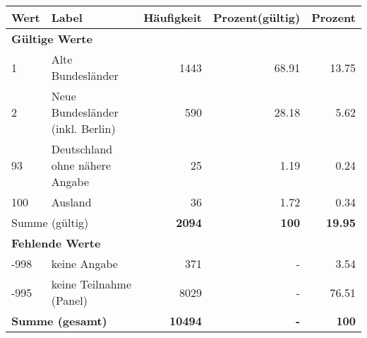      \begin{longtable}{lXrrr}
     \toprule
     \textbf{Wert} & \textbf{Label} & \textbf{Häufigkeit} & \textbf{Prozent(gültig)} & \textbf{Prozent} \\
     \endhead
     \midrule
     \multicolumn{5}{l}{\textbf{Gültige Werte}}\\

     1 &
     \multicolumn{1}{X}{ Alte Bundesländer   } &


       \num{1443} &
       \num[round-mode=places,round-precision=2]{68.91} &
         \num[round-mode=places,round-precision=2]{13.75} \\

     2 &
     \multicolumn{1}{X}{ Neue Bundesländer (inkl. Berlin)   } &


       \num{590} &
       \num[round-mode=places,round-precision=2]{28.18} &
         \num[round-mode=places,round-precision=2]{5.62} \\

     93 &
     \multicolumn{1}{X}{ Deutschland ohne nähere Angabe   } &


       \num{25} &
       \num[round-mode=places,round-precision=2]{1.19} &
         \num[round-mode=places,round-precision=2]{0.24} \\

     100 &
     \multicolumn{1}{X}{ Ausland   } &


       \num{36} &
       \num[round-mode=places,round-precision=2]{1.72} &
         \num[round-mode=places,round-precision=2]{0.34} \\
     \midrule
     \multicolumn{2}{l}{Summe (gültig)} &
       \textbf{\num{2094}} &
     \textbf{\num{100}} &
       \textbf{\num[round-mode=places,round-precision=2]{19.95}} \\
     \multicolumn{5}{l}{\textbf{Fehlende Werte}}\\
       -998 &
       keine Angabe &
         \num{371} &
        - &
         \num[round-mode=places,round-precision=2]{3.54} \\
       -995 &
       keine Teilnahme (Panel) &
         \num{8029} &
        - &
         \num[round-mode=places,round-precision=2]{76.51} \\
     \midrule
     \multicolumn{2}{l}{\textbf{Summe (gesamt)}} &
          \textbf{\num{10494}} &
        \textbf{-} &
        \textbf{\num{100}} \\
     \bottomrule
     \end{longtable}
     

